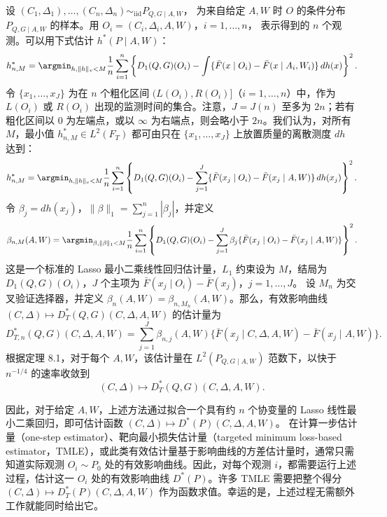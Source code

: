 设 $(C_1,\Delta_1),\ldots,(C_n,\Delta_n)\sim_{\mathrm{iid}}P_{Q,G\mid A,W}$，
为来自给定 $A,W$ 时 $O$ 的条件分布 $P_{Q,G\mid A,W}$ 的样本。用
$O_i=(C_i,\Delta_i,A,W)$，$i=1,\ldots,n$，
表示得到的 $n$ 个观测。可以用下式估计 $h^*(P\mid A,W)$：
\[
 h_{n,M}^*=\argmin_{h,\|h\|_v<M}\frac1n\sum_{i=1}^n
 \left\{D_1(Q,G)(O_i)-\int
 \{\bar F(x\mid O_i)-\bar F(x\mid A_i,W_i)\}\,dh(x)\right\}^2.
\]
令 $\{x_1,\ldots,x_J\}$ 为在 $n$ 个粗化区间
$(L(O_i),R(O_i)]$（$i=1,\ldots,n$）中，作为 $L(O_i)$ 或 $R(O_i)$ 出现的监测时间的集合。注意，$J=J(n)$ 至多为 $2n$；若有粗化区间以 0 为左端点，或以 $\infty$ 为右端点，则会略小于 $2n$。我们认为，对所有 $M$，最小值 $h_{n,M}^*\in L^2(F_T)$ 都可由只在 $\{x_1,\ldots,x_J\}$ 上放置质量的离散测度 $dh$ 达到：
\[
 h_{n,M}^*=\argmin_{h,\|h\|_v<M}\frac1n\sum_{i=1}^n
 \left\{D_1(Q,G)(O_i)-\sum_{j=1}^J
 \{\bar F(x_j\mid O_i)-\bar F(x_j\mid A,W)\}\,dh(x_j)\right\}^2.
\]
令 $\beta_j=dh(x_j)$，$\|\beta\|_1=\sum_{j=1}^n|\beta_j|$，并定义
\[
 \beta_{n,M}(A,W)=\argmin_{\beta,\|\beta\|_1<M}\frac1n\sum_{i=1}^n
 \left\{D_1(Q,G)(O_i)-\sum_{j=1}^J
 \beta_j\{\bar F(x_j\mid O_i)-\bar F(x_j\mid A,W)\}\right\}^2.
\]
这是一个标准的 Lasso 最小二乘线性回归估计量，$L_1$ 约束设为 $M$，结局为 $D_1(Q,G)(O_i)$，$J$ 个主项为
$\bar F(x_j\mid O_i)-\bar F(x_j)$，$j=1,\ldots,J$。
设 $M_n$ 为交叉验证选择器，并定义 $\beta_n(A,W)=\beta_{n,M_n}(A,W)$。那么，有效影响曲线
$(C,\Delta)\mapsto D_T^*(Q,G)(C,\Delta,A,W)$
的估计量为
\[
 D_{T,n}^*(Q,G)(C,\Delta,A,W)
 =\sum_{j=1}^J\beta_{n,j}(A,W)
 \{\bar F(x_j\mid C,\Delta,A,W)-\bar F(x_j\mid A,W)\}.
\]
根据定理 8.1，对于每个 $A,W$，该估计量在 $L^2(P_{Q,G\mid A,W})$ 范数下，以快于 $n^{-1/4}$ 的速率收敛到
\[
 (C,\Delta)\mapsto D_T^*(Q,G)(C,\Delta,A,W).
\]

因此，对于给定 $A,W$，上述方法通过拟合一个具有约 $n$ 个协变量的 Lasso 线性最小二乘回归，即可估计函数
$(C,\Delta)\mapsto D^*(P)(C,\Delta,A,W)$。
在计算一步估计量（one-step estimator）、靶向最小损失估计量（targeted minimum loss-based estimator，TMLE），或此类有效估计量基于影响曲线的方差估计量时，通常只需知道实际观测 $O_i\sim P_0$ 处的有效影响曲线。因此，对每个观测 $i$，都需要运行上述过程，估计这一 $O_i$ 处的有效影响曲线 $D^*(P)$。许多 TMLE 需要把整个得分
$(C,\Delta)\mapsto D_T^*(P)(C,\Delta,A,W)$
作为函数求值。幸运的是，上述过程无需额外工作就能同时给出它。

